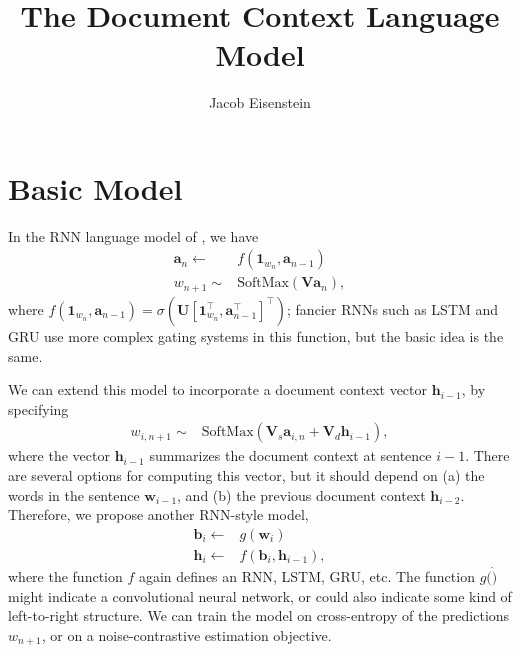 \documentclass[11pt,a4paper]{article}
\title{The Document Context Language Model}
\author{Jacob Eisenstein}
\newcommand{\trans}[1]{#1^{\top}}
\renewcommand{\vec}[1]{\mathbf{#1}}
\newcommand{\vh}[0]{\vec{h}}
\newcommand{\vw}[0]{\vec{w}}
\newcommand{\va}[0]{\vec{a}}
\newcommand{\vb}[0]{\vec{b}}
\newcommand{\mat}[1]{\bm{#1}}
\begin{document}
\maketitle

\section{Basic Model}

In the RNN language model of , we have
\begin{align}
\va_n \leftarrow & f(\vec{1}_{w_n}, \va_{n-1})\\
w_{n+1} \sim & \text{SoftMax}(\mat{V} \va_n),
\end{align}
where $f(\vec{1}_{w_n}, \va_{n-1}) = \sigma(\mat{U} \trans{[\trans{\vec{1}}_{w_n}, \trans{\va}_{n-1}]})$; fancier RNNs such as LSTM and GRU use more complex gating systems in this function, but the basic idea is the same. 

We can extend this model to incorporate a document context vector $\vh_{i-1}$, by specifying 
\begin{align}
w_{i,n+1} \sim & \text{SoftMax}(\mat{V}_s \va_{i,n} + \mat{V}_d \vh_{i-1}),
\end{align}
where the vector $\vh_{i-1}$ summarizes the document context at sentence $i-1$. There are several options for computing this vector, but it should depend on (a) the words in the sentence $\vw_{i-1}$, and (b) the previous document context $\vh_{i-2}$. Therefore, we propose another RNN-style model,
\begin{align}
\vb_i \leftarrow & g(\vw_i) \\
\vh_i \leftarrow & f(\vb_i, \vh_{i-1}),
\end{align}
where the function $f$ again defines an RNN, LSTM, GRU, etc. The function $g(\dot)$ might indicate a convolutional neural network, or could also indicate some kind of left-to-right structure. We can train the model on cross-entropy of the predictions $w_{n+1}$, or on a noise-contrastive estimation objective.
\end{document}
